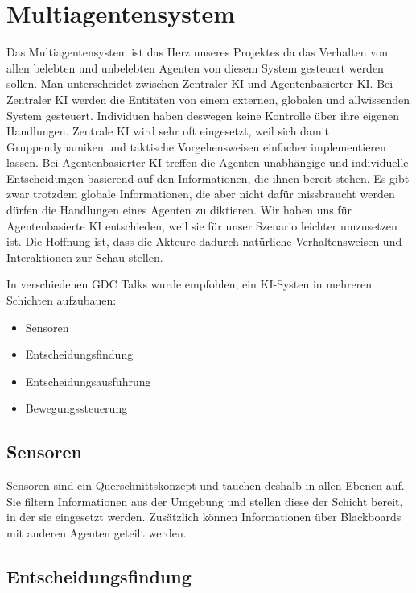 \section{Multiagentensystem}

Das Multiagentensystem ist das Herz unseres Projektes da das Verhalten von allen belebten und unbelebten Agenten von diesem System gesteuert werden sollen. Man unterscheidet zwischen Zentraler KI und Agentenbasierter KI. Bei Zentraler KI werden die Entitäten von einem externen, globalen und allwissenden System gesteuert. Individuen haben deswegen keine Kontrolle über ihre eigenen Handlungen. Zentrale KI wird sehr oft eingesetzt, weil sich damit Gruppendynamiken und taktische Vorgehensweisen einfacher implementieren lassen. Bei Agentenbasierter KI treffen die Agenten unabhängige und individuelle Entscheidungen basierend auf den Informationen, die ihnen bereit stehen. Es gibt zwar trotzdem globale Informationen, die aber nicht dafür missbraucht werden dürfen die Handlungen eines Agenten zu diktieren. Wir haben uns für Agentenbasierte KI entschieden, weil sie für unser Szenario leichter umzusetzen ist. Die Hoffnung ist, dass die Akteure dadurch natürliche Verhaltensweisen und Interaktionen zur Schau stellen.

In verschiedenen GDC \cite{YouTube_2019}\cite{YouTube_2022}\cite{YouTube_2023} Talks wurde empfohlen, ein KI-Systen in mehreren Schichten aufzubauen:

\begin{itemize}
\item Sensoren
\item Entscheidungsfindung
\item Entscheidungsausführung
\item Bewegungssteuerung
\end{itemize}

\subsection{Sensoren}

Sensoren sind ein Querschnittskonzept und tauchen deshalb in allen Ebenen auf. Sie filtern Informationen aus der Umgebung und stellen diese der Schicht bereit, in der sie eingesetzt werden. Zusätzlich können Informationen über Blackboards mit anderen Agenten geteilt werden.

\subsection{Entscheidungsfindung}

